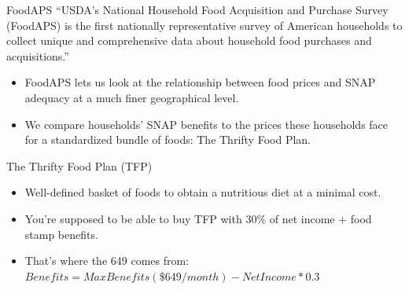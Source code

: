 \documentclass{beamer}
\begin{document}
\begin{frame}{FoodAPS}
``USDA's National Household Food Acquisition and Purchase Survey (FoodAPS) is the first nationally representative survey of American households to collect unique and comprehensive data about household food purchases and acquisitions.''
\begin{itemize}
\item FoodAPS lets us look at the relationship between food prices and SNAP adequacy at a much finer geographical level.
\item  We compare households' SNAP benefits to the prices these households face for a standardized bundle of foods: The Thrifty Food Plan.
\end{itemize}
\end{frame}

\begin{frame}{The Thrifty Food Plan (TFP)}
  \setlength{\leftmargini}{1em}
\begin{itemize}
\item
Well-defined basket of foods to obtain a nutritious diet at a minimal cost.

\item
You're supposed to be able to buy TFP with 30\% of net income + food stamp benefits.

\item That's where the 649 comes from: $ Benefits=MaxBenefits(\$649/month)-NetIncome*0.3 $
\end{itemize}
\end{frame}


\begin{frame}
\begin{figure}
\end{figure}
\end{frame}
\end{document}
